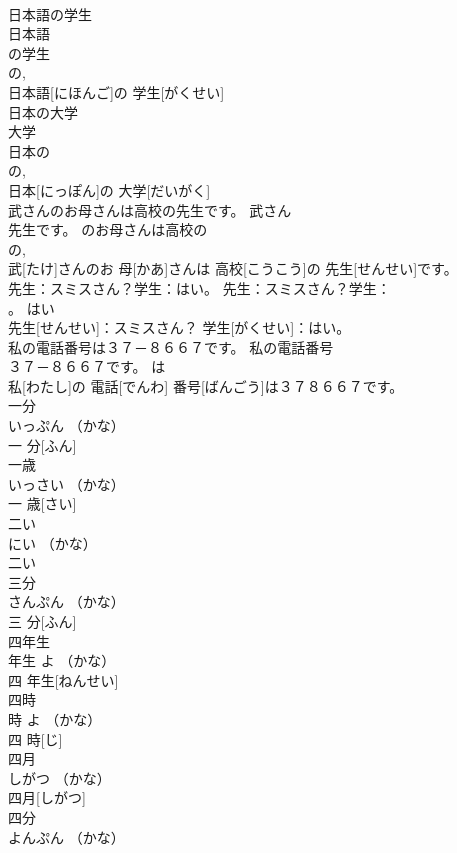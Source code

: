 \documentclass[8pt]{extreport}
\begin{document}
\begin{CJK}{UTF8}{min}
\\	日本語の学生	
\\	日本語
\\	の学生	
\\	の, 
\\	日本語[にほんご]の 学生[がくせい]	
\\	日本の大学	
\\	大学
\\	日本の	
\\	の, 
\\	日本[にっぽん]の 大学[だいがく]	
\\	武さんのお母さんは高校の先生です。	武さん
\\	先生です。	のお母さんは高校の	
\\	の, 
\\	武[たけ]さんのお 母[かあ]さんは 高校[こうこう]の 先生[せんせい]です。	
\\	先生：スミスさん？学生：はい。	先生：スミスさん？学生：
\\	。	はい	
\\	先生[せんせい]：スミスさん？ 学生[がくせい]：はい。	
\\	私の電話番号は３７－８６６７です。	私の電話番号
\\	３７－８６６７です。	は	
\\	私[わたし]の 電話[でんわ] 番号[ばんごう]は３７８６６７です。	
\\	一分	
\\	いっぷん	（かな）
\\	一 分[ふん]	
\\	一歳	
\\	いっさい	（かな）
\\	一 歳[さい]	
\\	二い	
\\	にい	（かな）
\\	二い	
\\	三分	
\\	さんぷん	（かな）
\\	三 分[ふん]	
\\	四年生	
\\	年生	よ	（かな）
\\	四 年生[ねんせい]	
\\	四時	
\\	時	よ	（かな）
\\	四 時[じ]	
\\	四月	
\\	しがつ	（かな）
\\	四月[しがつ]	
\\	四分	
\\	よんぷん	（かな）

\end{CJK}
\end{document}
